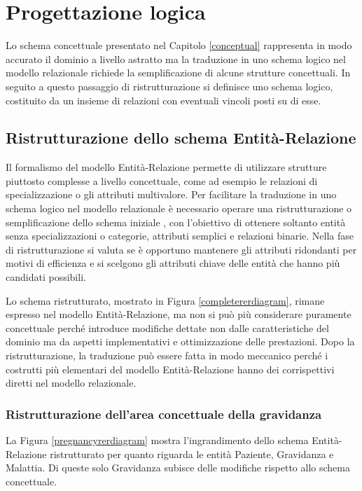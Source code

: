 \chapter{Progettazione logica}

Lo schema concettuale presentato nel Capitolo \ref{conceptual} rappresenta in modo accurato il dominio a livello astratto ma la traduzione in uno schema logico nel modello relazionale richiede la semplificazione di alcune strutture concettuali.
In seguito a questo passaggio di ristrutturazione si definisce uno schema logico, costituito da un insieme di relazioni con eventuali vincoli posti su di esse.

\section{Ristrutturazione dello schema Entità-Relazione}
\label{restructuring}

Il formalismo del modello Entità-Relazione permette di utilizzare strutture piuttosto complesse a livello concettuale, come ad esempio le relazioni di specializzazione o gli attributi multivalore.
Per facilitare la traduzione in uno schema logico nel modello relazionale è necessario operare una ristrutturazione o semplificazione dello schema iniziale \cite{Atz23}, con l'obiettivo di ottenere soltanto entità senza specializzazioni o categorie, attributi semplici e relazioni binarie.
Nella fase di ristrutturazione si valuta se è opportuno mantenere gli attributi ridondanti per motivi di efficienza e si scelgono gli attributi chiave delle entità che hanno più candidati possibili.

Lo schema ristrutturato, mostrato in Figura \ref{completererdiagram}, rimane espresso nel modello Entità-Relazione, ma non si può più considerare puramente concettuale perché introduce modifiche dettate non dalle caratteristiche del dominio ma da aspetti implementativi e ottimizzazione delle prestazioni.
Dopo la ristrutturazione, la traduzione può essere fatta in modo meccanico perché i costrutti più elementari del modello Entità-Relazione hanno dei corrispettivi diretti nel modello relazionale.

\subsection{Ristrutturazione dell'area concettuale della gravidanza}

La Figura \ref{pregnancyrerdiagram} mostra l'ingrandimento dello schema Entità-Relazione ristrutturato per quanto riguarda le entità Paziente, Gravidanza e Malattia.
Di queste solo Gravidanza subisce delle modifiche rispetto allo schema concettuale.


